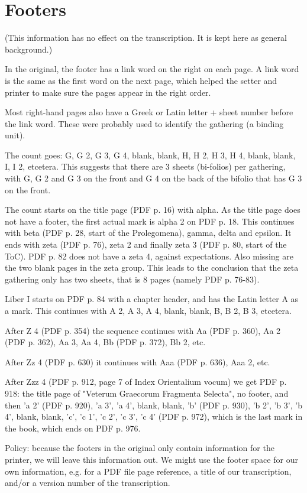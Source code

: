 \documentclass{report}
\begin{document}
\section{Footers}
(This information has no effect on the transcription.
It is kept here as general background.)

In the original, the footer has a link word on the right on each page. A link word is the same as the first word on the
next page, which helped the setter and printer to make sure the pages appear in the right order.

Most right-hand pages also have a Greek or Latin letter + sheet number before the link word.
These were probably used to identify the gathering (a binding unit).

The count goes:
G, G 2, G 3, G 4, blank, blank, H, H 2, H 3, H 4, blank, blank, I, I 2, etcetera.
This suggests that there are 3 sheets (bi-folios) per gathering,
with G, G 2 and G 3 on the front and G 4 on the back of the bifolio that has G 3 on the front.

The count starts on the title page (PDF p. 16) with alpha. As the title page does not have a footer,
the first actual mark is alpha 2 on PDF p. 18.
This continues with
beta (PDF p. 28, start of the Prolegomena), gamma, delta and epsilon.
It ends with zeta (PDF p. 76), zeta 2 and finally zeta 3 (PDF p. 80, start of the ToC). PDF p. 82 does not have a zeta 4, against expectations. Also missing are the two blank pages in the zeta group. This leads to the conclusion that the zeta gathering only has two sheets, that is 8 pages
(namely PDF p. 76-83).

Liber I starts on PDF p. 84 with a chapter header, and has the Latin letter A as a mark. This continues with A 2, A 3,
A 4, blank, blank, B, B 2, B 3, etcetera.

After Z 4 (PDF p. 354) the sequence continues with Aa (PDF p. 360), Aa 2 (PDF p. 362), Aa 3, Aa 4, Bb (PDF p. 372),
Bb 2, etc.

After Zz 4 (PDF p. 630) it continues with Aaa (PDF p. 636), Aaa 2, etc.

After Zzz 4 (PDF p. 912, page 7 of Index Orientalium vocum) we get PDF p. 918: the title page of "Veterum Graecorum Fragmenta Selecta", no footer, and then 'a 2' (PDF p. 920), 'a 3', 'a 4', blank, blank, 'b' (PDF p. 930), 'b 2', 'b 3', 'b 4', blank, blank, 'c', 'c 1', 'c 2', 'c 3', 'c 4' (PDF p. 972), which is the last mark in the book, which ends on PDF p. 976.

Policy: because the footers in the original only contain information for the printer, we will leave this information out.
We might use the footer space for our own information, e.g. for a PDF file page reference, a title of our transcription,
and/or a version number of the transcription.
\end{document}
